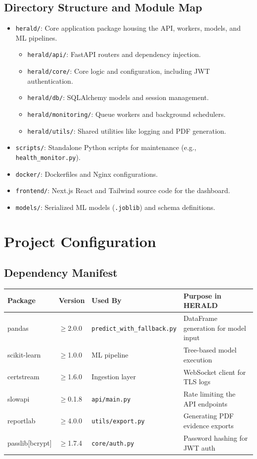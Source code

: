 \documentclass[12pt,a4paper]{report}
\begin{document}
\section{Directory Structure and Module Map}
\begin{itemize}
\item \texttt{herald/}: Core application package housing the API, workers, models, and ML pipelines.
  \begin{itemize}
  \item \texttt{herald/api/}: FastAPI routers and dependency injection.
  \item \texttt{herald/core/}: Core logic and configuration, including JWT authentication.
  \item \texttt{herald/db/}: SQLAlchemy models and session management.
  \item \texttt{herald/monitoring/}: Queue workers and background schedulers.
  \item \texttt{herald/utils/}: Shared utilities like logging and PDF generation.
  \end{itemize}
\item \texttt{scripts/}: Standalone Python scripts for maintenance (e.g., \texttt{health\_monitor.py}).
\item \texttt{docker/}: Dockerfiles and Nginx configurations.
\item \texttt{frontend/}: Next.js React and Tailwind source code for the dashboard.
\item \texttt{models/}: Serialized ML models (\texttt{.joblib}) and schema definitions.
\end{itemize}

\chapter{Project Configuration}
\section{Dependency Manifest}
\begin{longtable}{|p{3.5cm}|p{2cm}|p{3.5cm}|p{5cm}|}
\hline
\textbf{Package} & \textbf{Version} & \textbf{Used By} & \textbf{Purpose in HERALD} \\
\hline
\endhead
pandas & $\geq$2.0.0 & \texttt{predict\_with\_fallback.py} & DataFrame generation for model input \\
scikit-learn & $\geq$1.0.0 & ML pipeline & Tree-based model execution \\
certstream & $\geq$1.6.0 & Ingestion layer & WebSocket client for TLS logs \\
slowapi & $\geq$0.1.8 & \texttt{api/main.py} & Rate limiting the API endpoints \\
reportlab & $\geq$4.0.0 & \texttt{utils/export.py} & Generating PDF evidence exports \\
passlib[bcrypt] & $\geq$1.7.4 & \texttt{core/auth.py} & Password hashing for JWT auth \\
\hline
\end{longtable}
\end{document}
